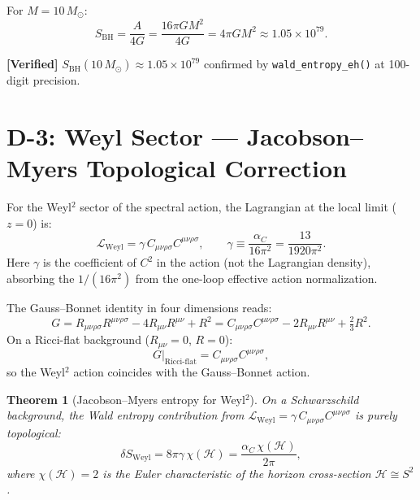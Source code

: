 \documentclass[11pt,a4paper]{article}
\newcommand{\Ricsq}{R_{\mu\nu}R^{\mu\nu}}
\newcommand{\Rsq}{R^2}
\newcommand{\Weylsq}{C_{\mu\nu\rho\sigma}C^{\mu\nu\rho\sigma}}
\theoremstyle{plain}
\newtheorem{theorem}{Theorem}[section]
\theoremstyle{definition}
\newcommand{\verified}[1]{%
  \par\smallskip\noindent
  \colorbox{green!10}{\parbox{\dimexpr\linewidth-2\fboxsep}{%
    \textcolor{green!50!black}{\textbf{[Verified]}} #1}}%
  \par\smallskip}
\begin{document}
For $M = 10\,M_\odot$:
\begin{equation}
  S_{\mathrm{BH}} = \frac{A}{4G} = \frac{16\pi G M^2}{4G}
  = 4\pi G M^2 \approx 1.05\times 10^{79}.
\end{equation}

\verified{$S_{\mathrm{BH}}(10\,M_\odot) \approx 1.05\times 10^{79}$
confirmed by \texttt{wald\_entropy\_eh()} at 100-digit precision.}


\section{D-3: Weyl Sector --- Jacobson--Myers Topological Correction}
\label{sec:D3}

For the Weyl${}^2$ sector of the spectral action, the Lagrangian at
the local limit ($z = 0$) is:
\begin{equation}\label{eq:L-weyl}
  \mathcal{L}_{\mathrm{Weyl}} = \gamma\,\Weylsq, \qquad
  \gamma \equiv \frac{\alpha_C}{16\pi^2} = \frac{13}{1920\pi^2}.
\end{equation}
Here $\gamma$ is the coefficient of $C^2$ in the action (not the
Lagrangian density), absorbing the $1/(16\pi^2)$ from the one-loop
effective action normalization.

The Gauss--Bonnet identity in four dimensions reads:
\begin{equation}\label{eq:GB}
  G = R_{\mu\nu\rho\sigma}R^{\mu\nu\rho\sigma} - 4\Ricsq + \Rsq
  = \Weylsq - 2\Ricsq + \tfrac{2}{3}\Rsq.
\end{equation}
On a Ricci-flat background ($R_{\mu\nu} = 0$, $R = 0$):
\begin{equation}
  G\big|_{\mathrm{Ricci\text{-}flat}} = \Weylsq,
\end{equation}
so the Weyl${}^2$ action coincides with the Gauss--Bonnet action.

\begin{theorem}[Jacobson--Myers entropy for Weyl${}^2$]\label{thm:JM}
On a Schwarzschild background, the Wald entropy contribution from
$\mathcal{L}_{\mathrm{Weyl}} = \gamma\,\Weylsq$ is purely topological:
\begin{equation}\label{eq:delta-S-weyl}
  \delta S_{\mathrm{Weyl}} = 8\pi\gamma\,\chi(\mathcal{H})
  = \frac{\alpha_C\,\chi(\mathcal{H})}{2\pi},
\end{equation}
where $\chi(\mathcal{H}) = 2$ is the Euler characteristic of the
horizon cross-section $\mathcal{H} \cong S^2$.
\end{theorem}
\end{document}
